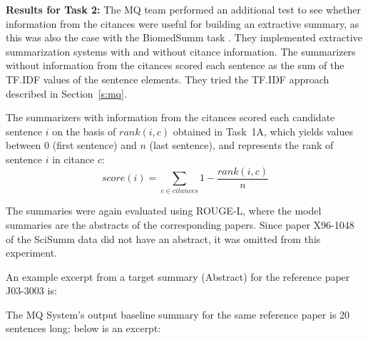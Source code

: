 \documentclass[11pt]{article}
\begin{document}
\textbf{Results for Task 2:} The MQ team performed an additional test
to see whether information from the citances were useful for building
an extractive summary, as this was also the case with the BiomedSumm
task \cite{Molla:ALTA2014}.  They implemented extractive summarization
systems with and without citance information.  The summarizers without
information from the citances scored each sentence as the sum of the
TF.IDF values of the sentence elements. They tried the TF.IDF approach
described in Section~\ref{s:mq}.

The summarizers with information from the citances scored each candidate sentence 
$i$ on the basis of $rank(i,c)$ obtained in Task~1A, which yields values between 0 
(first sentence) and $n$ (last sentence), and represents the rank of sentence $i$ 
in citance $c$:
\vspace{-3mm}
$$
score(i) = \sum_{c\in citances}1-\frac{rank(i,c)}{n}
$$

The summaries were again evaluated using ROUGE-L, where the model
summaries are the abstracts of the corresponding papers. Since paper
X96-1048 of the SciSumm data did not have an abstract, it was omitted
from this experiment.

An example excerpt from a target summary (Abstract) for the reference 
paper J03-3003 is:

\noindent{}

The MQ System's output baseline summary for the same reference paper is 20 sentences long; 
below is an excerpt:
\end{document}
